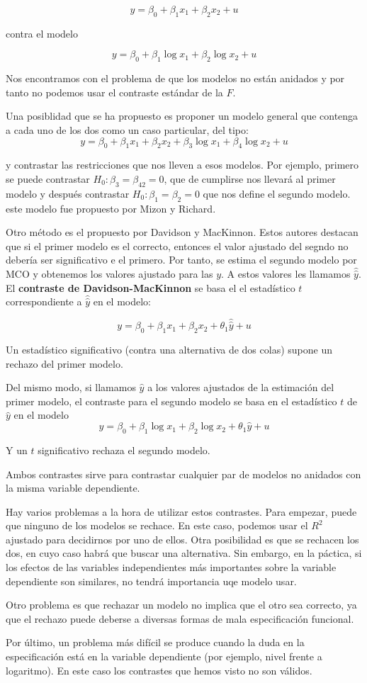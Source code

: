\[y=\beta_0+\beta_1x_1+\beta_2x_2+u\]

contra el modelo

\[y=\beta_0+\beta_1\log{x_1}+\beta_2\log{x_2}+u\]

Nos encontramos con el problema de que los modelos no est\'an anidados y por tanto no podemos usar el contraste est\'andar de la $F$.

Una posiblidad que se ha propuesto es proponer un modelo general que contenga a cada uno de los dos como un caso particular, del tipo:
\[y=\beta_0+\beta_1x_1+\beta_2x_2+\beta_3\log{x_1}+\beta_4\log{x_2}+u\]

y contrastar las restricciones que nos lleven a esos modelos. Por ejemplo, primero se puede contrastar $H_0:\beta_3=\beta_42=0$, que de cumplirse nos llevar\'a al primer modelo y despu\'es contrastar $H_0:\beta_1=\beta_2=0$ que nos define el segundo modelo. este modelo fue propuesto por Mizon y Richard.

Otro m\'etodo es el propuesto por Davidson y MacKinnon. Estos autores destacan que si el primer modelo es el correcto, entonces el valor ajustado del segndo no deber\'ia ser significativo e el primero. Por tanto, se estima el segundo modelo por MCO y obtenemos los valores ajustado para las $y$. A estos valores les llamamos $\hat{\hat{y}}$. El \textbf{contraste de Davidson-MacKinnon} se basa el el estad\'istico $t$ correspondiente a $\hat{\hat{y}}$ en el modelo:

\[y=\beta_0+\beta_1x_1+\beta_2x_2+\theta_1\hat{\hat{y}}+u\]
 
Un estad\'istico significativo (contra una alternativa de dos colas) supone un rechazo del primer modelo.

Del mismo modo, si llamamos $\hat{y}$ a los valores ajustados de la estimaci\'on del primer modelo, el contraste para el segundo modelo se basa en el estad\'istico $t$ de $\hat{y}$ en el modelo
\[y=\beta_0+\beta_1\log{x_1}+\beta_2\log{x_2}+\theta_1\hat{y}+u\]

Y un $t$ significativo rechaza el segundo modelo.

Ambos contrastes sirve para contrastar cualquier par de modelos no anidados con la misma variable dependiente.

Hay varios problemas a la hora de utilizar estos contrastes. Para empezar, puede que ninguno de los modelos se rechace. En este caso, podemos usar el $R^2$ ajustado para decidirnos por uno de ellos. Otra posibilidad es que se rechacen los dos, en cuyo caso habr\'a que buscar una alternativa. Sin embargo, en la p\'actica, si los efectos de las variables independientes m\'as importantes sobre la variable dependiente son similares, no tendr\'a importancia uqe modelo usar.

Otro problema es que rechazar un modelo no implica que el otro sea correcto, ya que el rechazo puede deberse a diversas formas de mala especificaci\'on funcional.

Por \'ultimo, un problema m\'as dif\'icil se produce cuando la duda en la especificaci\'on est\'a en la variable dependiente (por ejemplo, nivel frente a logaritmo). En este caso los contrastes que hemos visto no son v\'alidos.
